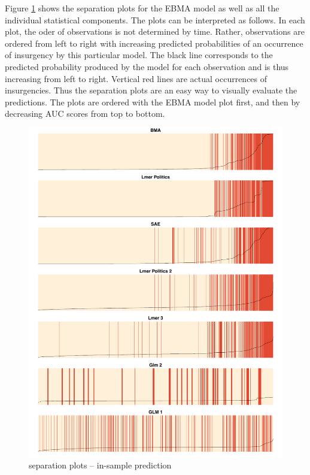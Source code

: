 \documentclass[pdftex,12pt,fullpage,oneside]{amsart}
\begin{document}
Figure \ref{InSam1sep} shows the separation plots for the EBMA model as
well as all the individual statistical components. The plots can be
interpreted as follows. In each plot, the oder of observations is not
determined by time.  Rather, observations are ordered from left to right
with increasing predicted probabilities of an occurrence of insurgency
by this particular model. The black line corresponds to the predicted
probability produced by the model for each observation and is thus
increasing from left to right. Vertical red lines are actual
occurrences of insurgencies. Thus the separation plots are an easy way
to visually evaluate the predictions. The plots are ordered with the
EBMA model plot first, and then by decreasing AUC scores from top to
bottom.

\begin{figure}[ht!]
\caption{separation plots -- in-sample prediction}
\label{InSam1sep}
\includegraphics[width=6.2 in]{Plots_Insample_NoICEWS}
\end{figure}
\end{document}
